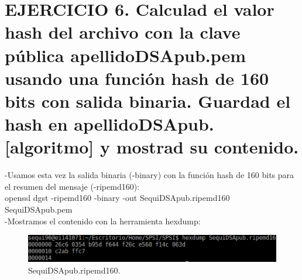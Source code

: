 



\section{EJERCICIO 6. Calculad el valor hash del archivo con la clave pública apellidoDSApub.pem usando una función hash de 160 bits con salida binaria. Guardad el hash en apellidoDSApub.[algoritmo] y mostrad su contenido. }

-Usamos esta vez la salida binaria (-binary) con la función hash de 160 bits para el resumen del mensaje (-ripemd160):\\

openssl dgst -ripemd160 -binary -out SequiDSApub.ripemd160 SequiDSApub.pem \\

-Mostramos el contenido con la herramienta hexdump:\\

\begin{figure}[h]
	\centering
	\includegraphics[width=1\textwidth]{imagenes/SequiDSApubripemd160}
	\caption{SequiDSApub.ripemd160.}
\end{figure}












